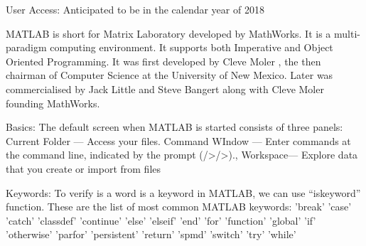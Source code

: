 \documentclass[fleqn,letterpaper,12pt]{report}
\begin{document}
User Access: \newline
Anticipated to be in the calendar year of 2018 \newline 


\vfill

%
\newpage
{}
{}
\problem
MATLAB is short for Matrix Laboratory developed by MathWorks.  It is a multi-paradigm computing environment. It supports both Imperative and Object Oriented Programming. It was first developed by Cleve Moler , the then chairman of Computer Science at the University of New Mexico. Later was commercialised by Jack Little and Steve Bangert along with Cleve Moler founding MathWorks. 

Basics:\newline
The default screen when MATLAB is started consists of three panels:
Current Folder — Access your files. 
Command WIndow — Enter commands at the command line, indicated by the prompt (/>/>).,
Workspace— Explore data that you create or import from files

Keywords:\newline
To verify is a word is a keyword in MATLAB, we can use “iskeyword” function.\newline
These are the list of most common MATLAB keywords:\newline
	'break'\newline
    'case'\newline
    'catch'\newline
    'classdef'\newline
    'continue'\newline
    'else'\newline
    'elseif'\newline
    'end'\newline
    'for'\newline
    'function'\newline
    'global'\newline
    'if'\newline
    'otherwise'\newline
    'parfor'\newline
    'persistent'\newline
    'return'\newline
    'spmd'\newline
    'switch'\newline
    'try'\newline
    'while'
	
\end{document}
